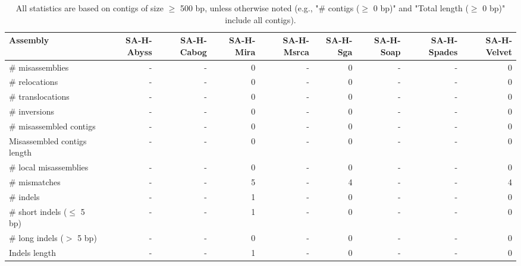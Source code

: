 \documentclass[12pt,a4paper]{article}
\begin{document}
\begin{table}[ht]
\begin{center}
\caption{All statistics are based on contigs of size $\geq$ 500 bp, unless otherwise noted (e.g., "\# contigs ($\geq$ 0 bp)" and "Total length ($\geq$ 0 bp)" include all contigs).}
\begin{tabular}{|l*{8}{|r}|}
\hline
Assembly & SA-H-Abyss & SA-H-Cabog & SA-H-Mira & SA-H-Msrca & SA-H-Sga & SA-H-Soap & SA-H-Spades & SA-H-Velvet \\ \hline
\# misassemblies & - & - & 0 & - & 0 & - & - & 0 \\ \hline
\hspace{5mm}\# relocations & - & - & 0 & - & 0 & - & - & 0 \\ \hline
\hspace{5mm}\# translocations & - & - & 0 & - & 0 & - & - & 0 \\ \hline
\hspace{5mm}\# inversions & - & - & 0 & - & 0 & - & - & 0 \\ \hline
\# misassembled contigs & - & - & 0 & - & 0 & - & - & 0 \\ \hline
Misassembled contigs length & - & - & 0 & - & 0 & - & - & 0 \\ \hline
\# local misassemblies & - & - & 0 & - & 0 & - & - & 0 \\ \hline
\# mismatches & - & - & 5 & - & 4 & - & - & 4 \\ \hline
\# indels & - & - & 1 & - & 0 & - & - & 0 \\ \hline
\hspace{5mm}\# short indels ($\leq$ 5 bp) & - & - & 1 & - & 0 & - & - & 0 \\ \hline
\hspace{5mm}\# long indels ($>$ 5 bp) & - & - & 0 & - & 0 & - & - & 0 \\ \hline
Indels length & - & - & 1 & - & 0 & - & - & 0 \\ \hline
\end{tabular}
\end{center}
\end{table}
\end{document}

